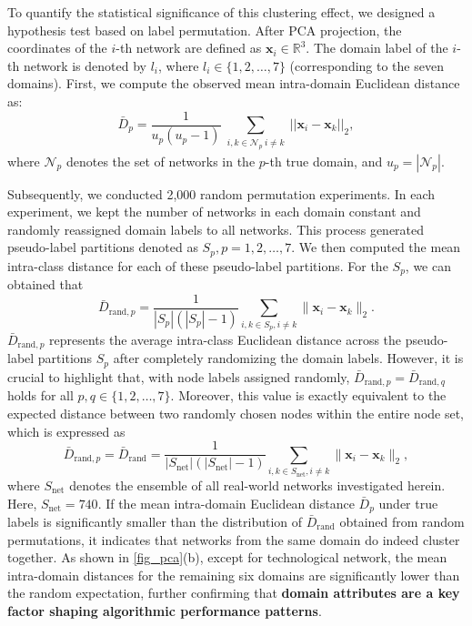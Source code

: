 \documentclass{article}
\begin{document}
To quantify the statistical significance of this clustering effect, we designed a hypothesis test based on label permutation. After PCA projection, the coordinates of the $i$-th network are defined as $\bm{x}_i \in \mathbb{R}^3$. The domain label of the $i$-th network is denoted by $l_i$, where $l_i \in \{1, 2, \dots, 7\}$ (corresponding to the seven domains). First, we compute the observed mean intra-domain Euclidean distance as:
\begin{equation}
		 \bar{D}_{p} =  \frac{1}{u_p (u_p - 1)} \sum_{\substack{i,k \in \mathcal{N}_p \ i \neq k}} ||\bm{x}_i - \bm{x}_k||_{2},
	 \end{equation}
 where $\mathcal{N}_p$ denotes the set of networks in the $p$-th true domain, and $u_p=|\mathcal{N}_p|$.

 Subsequently, we conducted 2,000 random permutation experiments. In each experiment, we kept the number of networks in each domain constant and randomly reassigned domain labels to all networks. This process generated pseudo-label partitions denoted as $S_p, p=1, 2, \dots, 7$. We then computed the mean intra-class distance for each of these pseudo-label partitions. For the $S_p$, we can obtained that
\begin{equation}
	\bar{D}_{\text{rand}, p}=  \frac{1}{|S_p| (|S_p| - 1)} \sum_{i,k \in S_p, i \neq k} \|\bm{x}_i - \bm{x}_k\|_2.
\end{equation}
$\bar{D}_{\text{rand},p}$ represents the average intra-class Euclidean distance across the pseudo-label partitions $S_p$ after completely randomizing the domain labels. However, it is crucial to highlight that, with node labels assigned randomly, $\bar{D}_{\text{rand}, p} = \bar{D}_{\text{rand}, q}$ holds for all $p, q \in \{1, 2, \dots, 7 \}$. Moreover, this value is exactly equivalent to the expected distance between two randomly chosen nodes within the entire node set, which is expressed as 
$$\bar{D}_{\text{rand}, p} = \bar{D}_{\text{rand}} = \frac{1}{|S_\text{net}| (|S_\text{net}| - 1)} \sum_{i,k \in S_\text{net}, i \neq k} \|\bm{x}_i - \bm{x}_k\|_2, $$ where $S_\text{net}$ denotes the ensemble of all real-world networks investigated herein. Here, $S_\text{net}=740$. If the mean intra-domain Euclidean distance $\bar{D}_p$ under true labels is significantly smaller than the distribution of $\bar{D}_{\text{rand}}$ obtained from random permutations, it indicates that networks from the same domain do indeed cluster together. As shown in \autoref{fig_pca}(b), except for technological network, the mean intra-domain distances for the remaining six domains are significantly lower than the random expectation, further confirming that \textbf{domain attributes are a key factor shaping algorithmic performance patterns}.
	
\end{document}
